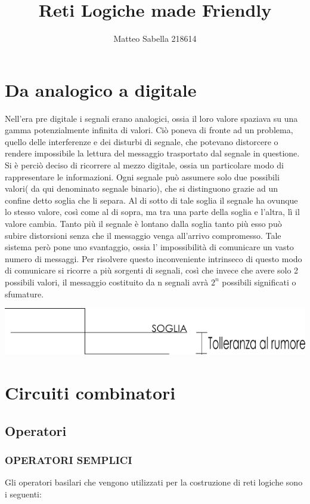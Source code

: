 \documentclass[a4paper]{book}
\title{Reti Logiche made Friendly}
\author{Matteo Sabella 218614}
\begin{document}
\maketitle


\chapter{Da analogico a digitale}
Nell'era pre digitale i segnali erano analogici, ossia il loro valore spaziava su una gamma potenzialmente infinita di valori.
Ciò poneva di fronte ad un problema, quello delle interferenze e dei disturbi di segnale, che potevano distorcere o rendere impossibile la lettura del messaggio trasportato dal segnale in questione.
Si è perciò deciso di ricorrere al mezzo digitale, ossia un particolare modo di rappresentare le informazioni.
Ogni segnale può assumere solo due possibili valori( da qui denominato segnale binario), che si distinguono grazie ad un confine detto soglia che li separa.
Al di sotto di tale soglia il segnale ha ovunque lo stesso valore, così come al di sopra, ma tra una parte della soglia e l'altra, lì il valore cambia.
Tanto più il segnale è lontano dalla soglia tanto più esso può subire distorsioni senza che il messaggio venga all'arrivo compromesso.
Tale sistema però pone uno svantaggio, ossia l' impossibilità di comunicare un vasto numero di messaggi.
Per risolvere questo inconveniente intrinseco di questo modo di comunicare si ricorre a più sorgenti di segnali, così che invece che avere solo 2 possibili valori, il messaggio costituito da n segnali avrà \(2^n\) possibili significati o sfumature.

\includegraphics[width=\textwidth]{SchemaDigitale}
\chapter{Circuiti combinatori}
\section{Operatori}
\subsection{OPERATORI SEMPLICI}
Gli operatori basilari che vengono utilizzati per la costruzione di reti logiche sono i seguenti:\\
\end{document}
